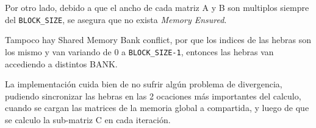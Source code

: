 Por otro lado, debido a que el ancho de cada matriz A y B
son multiplos siempre del \texttt{BLOCK\_SIZE}, se asegura
que no exista \emph{Memory Ensured}.

Tampoco hay Shared Memory Bank conflict, por que los indices
de las hebras son los mismo y van variando de 0 a \texttt{BLOCK\_SIZE-1},
entonces las hebras van accediendo a distintos BANK.

La implementación cuida bien de no sufrir algún problema de divergencia,
pudiendo sincronizar las hebras en las 2 ocaciones más importantes
del calculo, cuando se cargan las matrices de la memoria global a compartida,
y luego de que se calculo la sub-matriz C en cada iteración.

